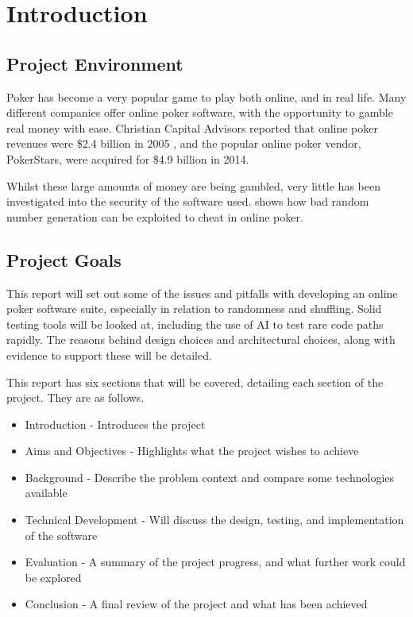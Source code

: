 \section{Introduction}

\subsection{Project Environment}

Poker has become a very popular game to play both online, and in real life.
Many different companies offer online poker software, with the opportunity
to gamble real money with ease. Christian Capital Advisors reported that
online poker revenues were \$2.4 billion in 2005 \parencite{website:newsweek2005},
and the popular online poker vendor, PokerStars, were acquired for \$4.9 billion
in 2014. \parencite{website:heinter2014}

Whilst these large amounts of money are being gambled, very little has been
investigated into the security of the software used. \parencite{arkin1999}
shows how bad random number generation can be exploited to cheat in online
poker.

\subsection{Project Goals}

This report will set out some of the issues and pitfalls with developing an
online poker software suite, especially in relation to randomness and shuffling.
Solid testing tools will be looked at, including the use of AI to test rare
code paths rapidly. The reasons behind design choices and architectural choices, along with
evidence to support these will be detailed.

This report has six sections that will be covered, detailing each section of
the project. They are as follows.

\begin{itemize}
    \item Introduction - Introduces the project
    \item Aims and Objectives - Highlights what the project wishes to achieve
    \item Background - Describe the problem context and compare some technologies available
    \item Technical Development - Will discuss the design, testing, and implementation of the software
    \item Evaluation - A summary of the project progress, and what further work could be explored
    \item Conclusion - A final review of the project and what has been achieved
\end{itemize}

